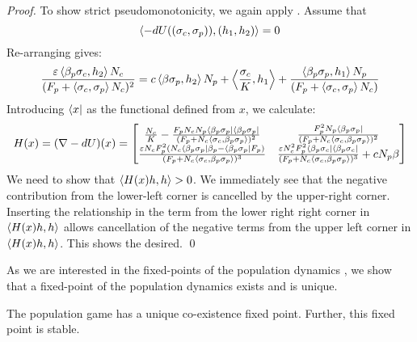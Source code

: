 \begin{proof}
  To show strict pseudomonotonicity, we again apply . Assume that
  \begin{equation}
    \left \langle -dU((\sigma_c,\sigma_p)),(h_1, h_2) \right \rangle = 0
  \end{equation}
  Re-arranging gives:
  \begin{equation}
    \label{eq:h1_h2_rel}
    \frac{\varepsilon \left \langle \beta_p \sigma_c,h_2 \right \rangle N_c}{(F_p + \left \langle \sigma_c,\sigma_p \right \rangle N_c)^2} = c\left \langle \beta \sigma_p,h_2 \right \rangle N_p + \left \langle \frac{\sigma_c}{K},h_1 \right \rangle + \frac{\left \langle \beta_p \sigma_p,h_1 \right \rangle N_p}{(F_p + \left \langle \sigma_c,\sigma_p \right \rangle N_c)}
  \end{equation}
  Introducing $\langle x \rvert$ as the functional defined from $x$, we calculate:
  \begin{equation}
    \label{eq:hess_mat}
    H(x) = (\nabla -dU)(x) =
    \begin{bmatrix}
      \frac{N_c}{K} - \frac{F_p N_c N_p \langle \beta_p \sigma_p \rvert \langle \beta_p \sigma_p \rvert}{(F_p + N_c \left \langle \sigma_c,\beta_p \sigma_p \right \rangle)^2} & \frac{F_p^2 N_p \langle \beta_p \sigma_p \rvert}{(F_p + N_c \left \langle \sigma_c,\beta_p \sigma_p \right \rangle)^2} \\
      \frac{\varepsilon N_cF_p^2 (N_c \langle \beta_p \sigma_p \rvert \beta_p - \langle \beta_p \sigma_p \rvert F_p)}{(F_p + N_c \left \langle \sigma_c,\beta_p \sigma_p \right \rangle)^3} & \frac{\varepsilon N_c^2 F_p^2 \langle \beta_p \sigma_c \rvert \langle \beta_p \sigma_c \rvert}{(F_p + N_c \left \langle \sigma_c,\beta_p \sigma_p \right \rangle)^3}+c N_p \beta
    \end{bmatrix}
  \end{equation}
  We need to show that $\left \langle H(x)h,h \right \rangle>0$. We immediately see that the negative contribution from the lower-left corner is cancelled by the upper-right corner. Inserting the relationship  in the term from the lower right right corner in $\left \langle H(x)h,h \right \rangle$ allows cancellation of the negative terms from the upper left corner in $\left \langle H(x)h,h \right \rangle$. This shows the desired. %
  \qed
\end{proof}
As we are interested in the fixed-points of the population dynamics , we show that a fixed-point of the population dynamics exists and is unique.
\begin{theorem}
  The population game  has a unique co-existence fixed point. Further, this fixed point is stable.
\end{theorem}
